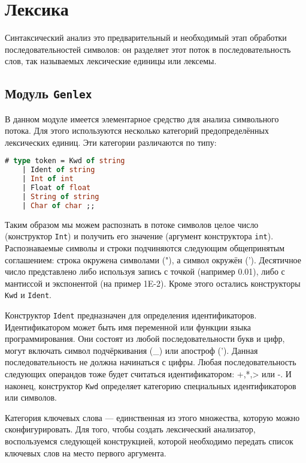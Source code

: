 \section{Лексика}

Синтаксический анализ это предварительный и необходимый этап обработки
последовательностей символов: он разделяет этот поток в последовательность слов,
так называемых лексические единицы или лексемы.

\subsection{Модуль \texttt{Genlex}}

В данном модуле имеется элементарное средство для анализа символьного потока.
Для этого используются несколько категорий предопределённых лексических единиц.
Эти категории различаются по типу:

\begin{lstlisting}[language=Caml]
# type token = Kwd of string
    | Ident of string
    | Int of int
    | Float of float
    | String of string
    | Char of char ;;
\end{lstlisting}

Таким образом мы можем распознать в потоке символов целое число (конструктор
\texttt{Int}) и получить его значение (аргумент конструктора \texttt{int}).
Распознаваемые символы и строки подчиняются следующим общепринятым соглашением:
строка окружена символами ("), а символ окружён ('). Десятичное число
представлено либо используя запись с точкой (например 0.01), либо с мантиссой и
экспонентой (на пример 1E-2). Кроме этого остались конструкторы \texttt{Kwd} и
\texttt{Ident}.

Конструктор \texttt{Ident} предназначен для определения идентификаторов.
Идентификатором может быть имя переменной или функции языка программирования.
Они состоят из любой последовательности букв и цифр, могут включать
символ подчёркивания (\_) или апостроф ('). Данная последовательность не должна
начинаться с цифры. Любая последовательность следующих операндов тоже будет
считаться идентификатором: +,*,> или -. И наконец, конструктор \texttt{Kwd}
определяет
категорию специальных идентификаторов или символов.

Категория ключевых слова --- единственная из этого множества, которую можно
сконфигурировать. Для того, чтобы создать лексический анализатор, воспользуемся
следующей конструкцией, которой необходимо передать список ключевых слов на
место первого аргумента.

